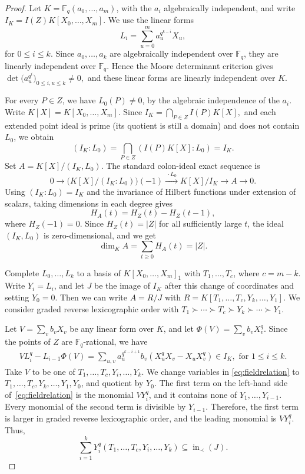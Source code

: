 \documentclass[11pt]{amsart}
\theoremstyle{definition}
\newcommand{\F}{\mathbb F}
\newcommand{\ini}{\operatorname{in}}
\newcommand{\card}[1]{\left|#1\right|}
\numberwithin{equation}{section}
\begin{document}
\begin{proof}
Let $K=\F_q(a_0,\ldots,a_m)$, with the $a_i$ algebraically independent,
and write $I_K=I(Z)K[X_0,\ldots,X_m]$. We use the linear forms
\[
 L_i=\sum_{u=0}^m a_u^{q^{k-i}}X_u,
\]
for $0\le i\le k$.
Since $a_0,\ldots,a_k$ are algebraically independent over $\F_q$,
they are linearly independent over $\F_q$. Hence the Moore
determinant criterion \cite[Lem.~3.51]{LidlNiederreiter1997} gives
\(
\det\bigl(a_u^{q^i}\bigr)_{0\le i,u\le k}\ne0,
\)
and these linear forms
are linearly independent over $K$.



For every $P\in Z$, we have $L_0(P)\ne0$, by the algebraic
independence of the $a_i$. Write $K[X]=K[X_0,\ldots,X_m]$.
Since
\(
I_K=\bigcap_{P\in Z}I(P)K[X],
\)
and each extended point ideal is prime (its quotient is still a domain) and does not contain $L_0$,
we obtain
\[
(I_K:L_0)
=\bigcap_{P\in Z}(I(P)K[X]:L_0)
=I_K.
\]
Set $A=K[X]/(I_K,L_0)$. The standard colon-ideal exact sequence is
\[
0\longrightarrow
\bigl(K[X]/(I_K:L_0)\bigr)(-1)
\xrightarrow{\ \cdot L_0\ }
K[X]/I_K
\longrightarrow A
\longrightarrow0.
\]
Using $(I_K:L_0)=I_K$ and the invariance of Hilbert functions
under extension of scalars, taking dimensions in each degree gives
\begin{equation}\label{eq:artinian}
H_A(t)=H_Z(t)-H_Z(t-1),
\end{equation}
where $H_Z(-1)=0$. Since $H_Z(t)=\card Z$ for all sufficiently
large $t$, the ideal $(I_K,L_0)$ is zero-dimensional, and we get
\[
\dim_K A
=\sum_{t\geq 0}H_A(t)
=\card Z.
\]

Complete $L_0,\ldots,L_k$ to a basis of $K[X_0,\dots,X_m]_1$ with $T_1,\ldots,T_c$, where $c=m-k$. Write $Y_i=L_i$, and let $J$ be the image of $I_K$
after this change of coordinates and setting $Y_0=0$.
Then we can write $A=R/J$ with
\(
 R=K[T_1,\ldots,T_c,Y_k,\ldots,Y_1].
\)
We consider graded reverse lexicographic order with
$T_1\succ \cdots\succ T_c\succ Y_k\succ \cdots\succ Y_1$.

Let $V=\sum_v b_vX_v$ be any linear form over $K$, and let
$\Phi(V)=\sum_v b_vX_v^q$. Since the points of $Z$ are $\F_q$-rational,
we have
\begin{equation}\label{eq:fieldrelation}
 \begin{split}
 VL_i^q-L_{i-1}\Phi(V)
 =\sum_{u,v}a_u^{q^{k-i+1}}b_v
           (X_u^qX_v-X_uX_v^q)
 \in I_K,\text{ for } 1\le i\le k.
 \end{split}
\end{equation}
Take $V$ to be one of $T_1,\ldots,T_c,Y_i,\ldots,Y_k$. We change variables in \eqref{eq:fieldrelation} to $T_1,\dots,T_c,Y_k,\dots,Y_1,Y_0$, and quotient by $Y_0$. The first term on the left-hand side of~\eqref{eq:fieldrelation} is the
monomial $VY_i^q$, and it contains none of $Y_1,\ldots,Y_{i-1}$.
Every monomial of the second term is divisible by $Y_{i-1}$.
Therefore, the first term is larger in graded reverse lexicographic
order, and the leading monomial is $VY_i^q$. Thus, 
$$
\sum_{i=1}^kY_i^q(T_1,\ldots,T_c,Y_i,\ldots,Y_k)
 \subseteq\ini_\prec(J).
$$


\end{proof}
\end{document}
